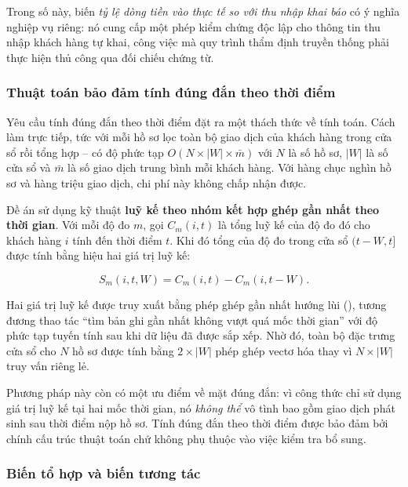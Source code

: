 Trong số này, biến \textit{tỷ lệ dòng tiền vào thực tế so với thu nhập khai báo}
có ý nghĩa nghiệp vụ riêng: nó cung cấp một phép kiểm chứng độc lập cho thông tin
thu nhập khách hàng tự khai, công việc mà quy trình thẩm định truyền thống phải
thực hiện thủ công qua đối chiếu chứng từ.

\subsubsection{Thuật toán bảo đảm tính đúng đắn theo thời điểm}
\label{subsubsec:point-in-time}

Yêu cầu tính đúng đắn theo thời điểm đặt ra một thách thức về tính toán. Cách làm
trực tiếp, tức với mỗi hồ sơ lọc toàn bộ giao dịch của khách hàng trong cửa sổ rồi
tổng hợp -- có độ phức tạp $O(N \times |W| \times \bar{m})$ với $N$ là số hồ sơ,
$|W|$ là số cửa sổ và $\bar{m}$ là số giao dịch trung bình mỗi khách hàng. Với
hàng chục nghìn hồ sơ và hàng triệu giao dịch, chi phí này không chấp nhận được.

Đề án sử dụng kỹ thuật \textbf{luỹ kế theo nhóm kết hợp ghép gần nhất theo thời
gian}. Với mỗi độ đo $m$, gọi $C_m(i, t)$ là tổng luỹ kế của độ đo đó cho khách
hàng $i$ tính đến thời điểm $t$. Khi đó tổng của độ đo trong cửa sổ $(t - W, t]$
được tính bằng hiệu hai giá trị luỹ kế:

\begin{equation}
S_m(i, t, W) = C_m(i, t) - C_m(i, t - W).
\label{eq:cumsum-window}
\end{equation}

Hai giá trị luỹ kế được truy xuất bằng phép ghép gần nhất hướng lùi
(), tương đương thao tác ``tìm bản ghi gần nhất không vượt quá
mốc thời gian'' với độ phức tạp tuyến tính sau khi dữ liệu đã được sắp xếp. Nhờ
đó, toàn bộ đặc trưng cửa sổ cho $N$ hồ sơ được tính bằng $2 \times |W|$ phép
ghép vectơ hóa thay vì $N \times |W|$ truy vấn riêng lẻ.

Phương pháp này còn có một ưu điểm về mặt đúng đắn: vì công thức chỉ sử dụng giá
trị luỹ kế tại hai mốc thời gian, nó \textit{không thể} vô tình bao gồm giao dịch
phát sinh sau thời điểm nộp hồ sơ. Tính đúng đắn theo thời điểm được bảo đảm bởi
chính cấu trúc thuật toán chứ không phụ thuộc vào việc kiểm tra bổ sung.

\subsubsection{Biến tổ hợp và biến tương tác}

